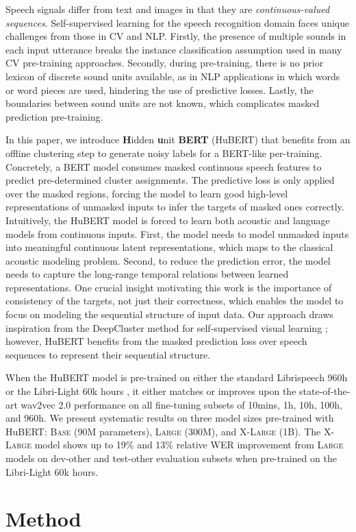 Speech signals differ from text and images in that they are \textit{continuous-valued} \textit{sequences}. Self-supervised learning for the speech recognition domain faces unique challenges from those in CV and NLP. Firstly, the presence of multiple sounds in each input utterance breaks the instance classification assumption used in many CV pre-training approaches. Secondly, during pre-training, there is no prior lexicon of discrete sound units available, as in NLP applications in which words or word pieces are used, hindering the use of predictive losses. Lastly, the boundaries between sound units are not known, which complicates masked prediction pre-training.

In this paper, we introduce \textbf{H}idden \textbf{u}nit \textbf{BERT} (HuBERT) that benefits from an offline clustering step to generate noisy labels for a BERT-like per-training. Concretely, a BERT model consumes masked continuous speech features to predict pre-determined cluster assignments. The predictive loss is only applied over the masked regions, forcing the model to learn good high-level representations of unmasked inputs to infer the targets of masked ones correctly. Intuitively, the HuBERT model is forced to learn both acoustic and language models from continuous inputs. First, the model needs to model unmasked inputs into meaningful continuous latent representations, which maps to the classical acoustic modeling problem. Second, to reduce the prediction error, the model needs to capture the long-range temporal relations between learned representations. One crucial insight motivating this work is the importance of consistency of the targets, not just their correctness, which enables the model to focus on modeling the sequential structure of input data. Our approach draws inspiration from the DeepCluster method for self-supervised visual learning \cite{caron2018deep}; however, HuBERT benefits from the masked prediction loss over speech sequences to represent their sequential structure.

When the HuBERT model is pre-trained on either the standard Librispeech 960h \cite{panayotov2015librispeech} or the Libri-Light 60k hours \cite{kahn2020libri}, it either matches or improves upon the state-of-the-art wav2vec 2.0 \cite{baevski2020wav2vec} performance on all fine-tuning subsets of 10mins, 1h, 10h, 100h, and 960h. We present systematic results on three model sizes pre-trained with HuBERT: \textsc{Base} (90M parameters), \textsc{Large} (300M), and \textsc{X-Large} (1B). The \textsc{X-Large} model shows up to 19\% and 13\% relative WER improvement from \textsc{Large} models on dev-other and test-other evaluation subsets when pre-trained on the Libri-Light 60k hours.\section{Method}

